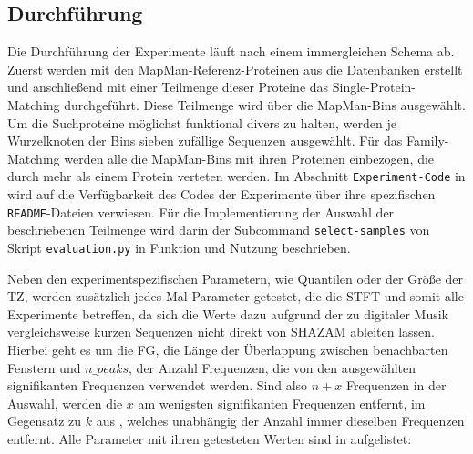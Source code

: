     \subsection{Durchführung} %
        \label{sub:durchfuhrung}
        Die Durchführung der Experimente läuft nach einem immergleichen Schema ab. Zuerst werden mit den MapMan-Referenz-Proteinen aus  die Datenbanken erstellt und anschließend mit einer Teilmenge dieser Proteine das Single-Protein-Matching durchgeführt. Diese Teilmenge wird über die MapMan-Bins ausgewählt. Um die Suchproteine möglichst funktional divers zu halten, werden je Wurzelknoten der Bins sieben zufällige Sequenzen ausgewählt. Für das Family-Matching werden alle die MapMan-Bins mit ihren Proteinen einbezogen, die durch mehr als einem Protein verteten werden. Im Abschnitt \texttt{Experiment-Code} in  wird auf die Verfügbarkeit des Codes der Experimente über ihre spezifischen \texttt{README}-Dateien verwiesen. Für die Implementierung der Auswahl der beschriebenen Teilmenge wird darin der Subcommand \texttt{select-samples} von Skript \texttt{evaluation.py} in Funktion und Nutzung beschrieben.

        Neben den experimentspezifischen Parametern, wie Quantilen oder der Größe der \acl{TZ}, werden zusätzlich jedes Mal Parameter getestet, die die \ac{STFT} und somit alle Experimente betreffen, da sich die Werte dazu aufgrund der zu digitaler Musik vergleichsweise kurzen Sequenzen nicht direkt von SHAZAM ableiten lassen. Hierbei geht es um die \ac{FG}, die Länge der Überlappung zwischen benachbarten Fenstern und $n\_peaks$, der Anzahl Frequenzen, die von den ausgewählten signifikanten Frequenzen verwendet werden. Sind also $n+x$ Frequenzen in der Auswahl, werden die $x$ am wenigsten signifikanten Frequenzen entfernt, im Gegensatz zu $k$ aus , welches unabhängig der Anzahl immer dieselben Frequenzen entfernt. Alle Parameter mit ihren getesteten Werten sind in  aufgelistet:
        
